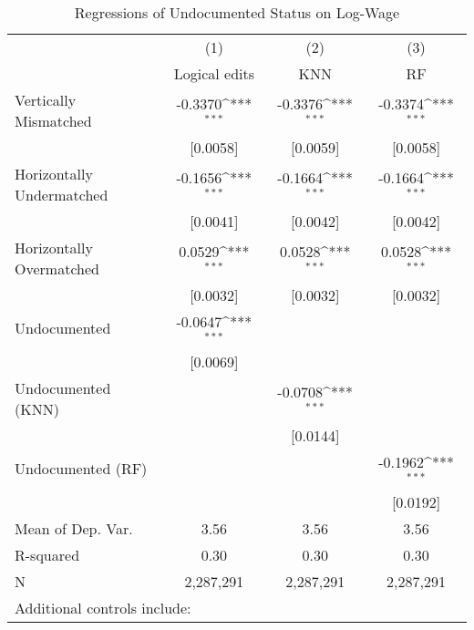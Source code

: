 \begin{table}[htbp]\centering
\def\sym#1{\ifmmode^{#1}\else\(^{#1}\)\fi}
\caption{Regressions of Undocumented Status on Log-Wage}
\begin{tabular}{l*{3}{c}}
\toprule
                    &\multicolumn{1}{c}{(1)}         &\multicolumn{1}{c}{(2)}         &\multicolumn{1}{c}{(3)}         \\
                    &Logical edits         &         KNN         &          RF         \\
\midrule
Vertically Mismatched&     -0.3370\sym{***}&     -0.3376\sym{***}&     -0.3374\sym{***}\\
                    &    [0.0058]         &    [0.0059]         &    [0.0058]         \\
\addlinespace
Horizontally Undermatched&     -0.1656\sym{***}&     -0.1664\sym{***}&     -0.1664\sym{***}\\
                    &    [0.0041]         &    [0.0042]         &    [0.0042]         \\
\addlinespace
Horizontally Overmatched&      0.0529\sym{***}&      0.0528\sym{***}&      0.0528\sym{***}\\
                    &    [0.0032]         &    [0.0032]         &    [0.0032]         \\
\addlinespace
Undocumented        &     -0.0647\sym{***}&                     &                     \\
                    &    [0.0069]         &                     &                     \\
\addlinespace
Undocumented (KNN)  &                     &     -0.0708\sym{***}&                     \\
                    &                     &    [0.0144]         &                     \\
\addlinespace
Undocumented (RF)   &                     &                     &     -0.1962\sym{***}\\
                    &                     &                     &    [0.0192]         \\
\midrule
Mean of Dep. Var.   &        3.56         &        3.56         &        3.56         \\
R-squared           &        0.30         &        0.30         &        0.30         \\
N                   &   2,287,291         &   2,287,291         &   2,287,291         \\
\bottomrule
\multicolumn{4}{l}{\footnotesize Additional controls include:}\\

\end{tabular}
\end{table}

